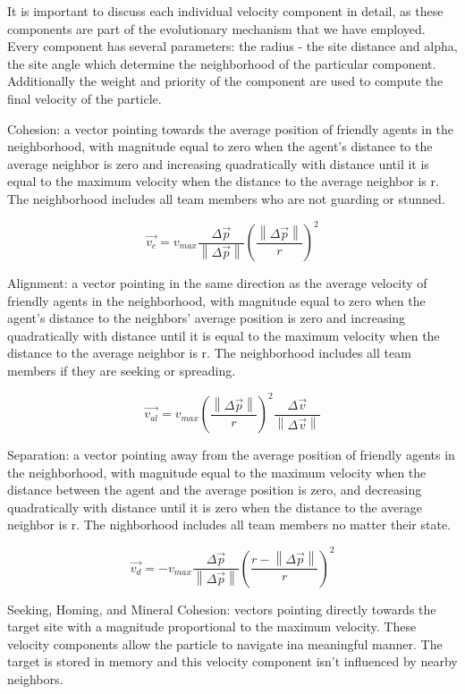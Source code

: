 \documentclass[12pt,journal,compsoc]{IEEEtran}
\begin{document}
It is important to discuss each individual velocity component in detail, as these components are part of the evolutionary mechanism that we have employed. Every component has several parameters: the radius - the site distance and alpha, the site angle which determine the neighborhood of the particular component. Additionally the weight and priority of the component are used to compute the final velocity of the particle.

Cohesion: a vector pointing towards the average position of friendly agents in the neighborhood, with magnitude equal to zero when the agent's distance to the average neighbor is zero and increasing quadratically with distance until it is equal to the maximum velocity when the distance to the average neighbor is r. The neighborhood includes all team members who are not guarding or stunned.

\[ \vec { v_{ c } } =v_{ max }\frac { \Delta  \vec { p }  }{ \left\|   \Delta \vec { p }  \right\|  } \left( \frac { \left\|  \Delta \vec {  p }  \right\|  }{ r }  \right) ^{ 2 } \]

Alignment: a vector pointing in the same direction as the average velocity of friendly agents in the neighborhood, with magnitude equal to zero when the agent's distance to the neighbors' average position is zero and increasing quadratically with distance until it is equal to the maximum velocity when the distance to the average neighbor is r. The neighborhood includes all team members if they are seeking or spreading.

\[ \vec { v_{ al } } =v_{ max }{\left( \frac { \left\| \Delta \vec { p } \right\|  }{ r }  \right)}^2\frac {\Delta \vec{v}} { \left\| \Delta \vec{v} \right\| } \]

Separation: a vector pointing away from the average position of friendly agents in the neighborhood, with magnitude equal to the maximum velocity when the distance between the agent and the average position is zero, and decreasing quadratically with distance until it is zero when the distance to the average neighbor is r. The nighborhood includes all team members no matter their state.

\[ \vec { v_{ d } } =-v_{ max }\frac {\Delta \vec{p}} { \left\| \Delta \vec{p} \right\| }{\left( \frac { r - \left\| \Delta \vec { p } \right\|  }{ r }  \right)}^2 \]

Seeking, Homing, and Mineral Cohesion: vectors pointing directly towards the target site with a magnitude proportional to the maximum velocity. These velocity components allow the particle to navigate ina  meaningful manner. The target is stored in memory and this velocity component isn't influenced by nearby neighbors.
\end{document}
